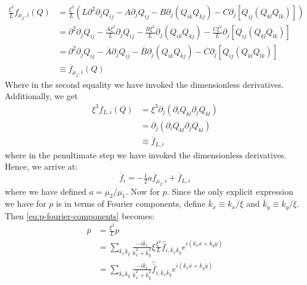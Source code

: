 \documentclass[reqno]{article}
\begin{document}
	\begin{equation}
	\begin{split}
	\frac{\xi^3}{L} f_{\mu_2, i} (Q) 
	&= \frac{\xi^3}{L} \left(
	L \partial^2 \partial_j Q_{ij} 
	- A \partial_j Q_{ij}
	- B \partial_j \left( Q_{ik} Q_{kj} \right)
	- C \partial_j \left[ Q_{ij} \left( Q_{kl} Q_{lk} \right) \right]
	\right) \\
	&= \partial^2 \partial_j Q_{ij}
	- \frac{A \xi^2}{L} \partial_j Q_{ij}
	- \frac{B \xi^2}{L} \partial_j 
	\left( Q_{ik}Q_{kj} \right)
	- \frac{C \xi^2}{L} \partial_j \left[ Q_{ij} \left( Q_{kl} Q_{lk} \right) \right] \\
	&= \partial^2 \partial_j Q_{ij}
	- \overline{A} \partial_j Q_{ij}
	- \overline{B} \partial_j 
	\left( Q_{ik}Q_{kj} \right)
	- \overline{C} \partial_j \left[ Q_{ij} \left( Q_{kl} Q_{lk} \right) \right] \\
	&\equiv \overline{f}_{\mu_2, i} (Q)
	\end{split}
	\end{equation}
	Where in the second equality we have invoked the dimensionless derivatives. 
	Additionally, we get
	\begin{equation}
	\begin{split}
	\xi^3 f_{L, i} (Q) 
	&= \xi^3 \partial_j \left( 
	\partial_i Q_{kl} \partial_j Q_{kl} 
	\right) \\
	&= \partial_j \left( 
	\partial_i Q_{kl} \partial_j Q_{kl} 
	\right) \\
	&\equiv \overline{f}_{L, i}
	\end{split}
	\end{equation}
	where in the penultimate step we have invoked the dimensionless derivatives. 
	Hence, we arrive at:
	\begin{equation}
	\overline{f}_i 
	= -\tfrac12 a \overline{f}_{\mu_2, i}
	+ \overline{f}_{L, i}
	\end{equation}
	where we have defined $a = \mu_2/\mu_1$. 
	Now for $p$.
	Since the only explicit expression we have for $p$ is in terms of Fourier components, define $\overline{k}_x \equiv k_x/\xi$ and $\overline{k}_y \equiv k_y/\xi$. 
	Then \eqref{eq:p-fourier-components} becomes:
	\begin{equation}
	\begin{split}
	\overline{p} 
	&= \frac{\xi^2}{L} p \\
	&= \sum_{\overline{k}_x \overline{k}_y}
	\frac{-i \overline{k}_i}{\overline{k}_x^2 + \overline{k}_y^2}
	\xi \frac{\xi^2}{L} 
	\hat{f}_{i, \overline{k}_x \overline{k}_y}
	e^{i \left(\overline{k}_x \overline{x} + \overline{k}_y \overline{y} \right)} \\
	&= \sum_{\overline{k}_x \overline{k}_y}
	\frac{-i \overline{k}_i}{\overline{k}_x^2 + \overline{k}_y^2}
	\hat{\overline{f}}_{i, \overline{k}_x \overline{k}_y}
	e^{i \left(\overline{k}_x \overline{x} + \overline{k}_y \overline{y} \right)} 
	\end{split}
	\end{equation}
\end{document}
